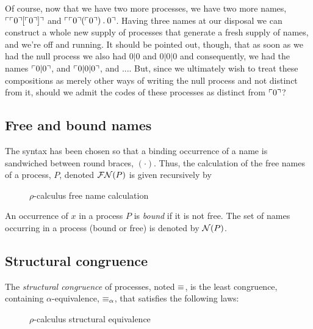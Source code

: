 Of course, now that we have two more processes, we have two more
names, $\ulcorner \ulcorner 0 \urcorner[{\ulcorner 0 \urcorner}] \urcorner$ and
$\ulcorner \ulcorner 0 \urcorner({\ulcorner 0 \urcorner}) \mathbin{.} 0 \urcorner$. Having three names at
our disposal we can construct a whole new supply of processes that
generate a fresh supply of names, and we're off and running. It should
be pointed out, though, that as soon as we had the null process we
also had $0|0$ and $0|0|0$ and consequently, we had the names
$\ulcorner  0|0  \urcorner$, and $\ulcorner 0|0|0 \urcorner$, and .... But, since we
ultimately wish to treat these compositions as merely other ways of
writing the null process and not distinct from it, should we admit the
codes of these processes as distinct from $\ulcorner 0 \urcorner$?

\subsection{Free and bound names}

The syntax has been chosen so that a binding occurrence of a name is
sandwiched between round braces, $( \cdot )$. Thus, the
calculation of the free names of a process, $P$, denoted
$\mathbin{\mathcal{FN}(P)}$ is given recursively by

\begin{figure}[tbp]
  \centering
  \caption{ $\rho$-calculus free name calculation }
\end{figure}

An occurrence of $x$ in a process $P$ is \textit{bound} if it is not
free. The set of names occurring in a process (bound or free) is
denoted by $\mathbin{\mathcal{N}(P)}$.

\subsection{Structural congruence}

The {\em structural congruence} of processes, noted $\mathbin{\equiv}$, is the
least congruence, containing $\alpha$-equivalence, $\mathbin{\equiv_{\alpha}}$, that
satisfies the following laws:

\begin{figure}[hbp]
  \centering
  \caption{ $\rho$-calculus structural equivalence }
\end{figure}

